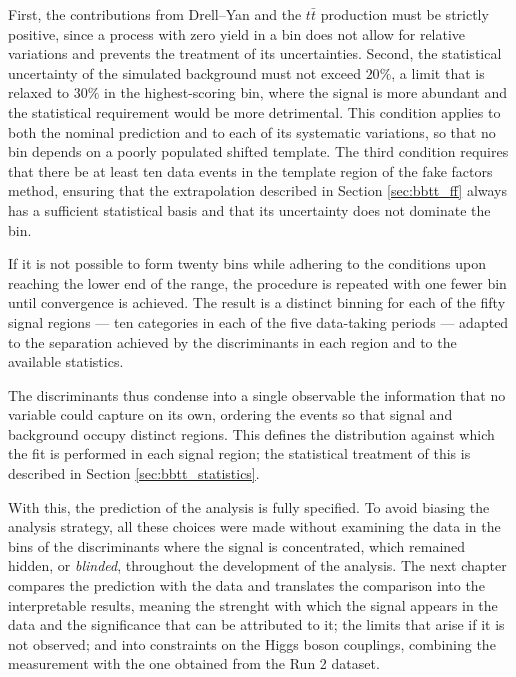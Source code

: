 First, the contributions from Drell--Yan and the $t\bar{t}$ production must be strictly positive, since a process with zero yield in a bin does not allow for relative variations and prevents the treatment of its uncertainties. Second, the statistical uncertainty of the simulated background must not exceed $20\%$, a limit that is relaxed to $30\%$ in the highest-scoring bin, where the signal is more abundant and the statistical requirement would be more detrimental. This condition applies to both the nominal prediction and to each of its systematic variations, so that no bin depends on a poorly populated shifted template. The third condition requires that there be at least ten data events in the template region of the fake factors method, ensuring that the extrapolation described in Section \ref{sec:bbtt_ff} always has a sufficient statistical basis and that its uncertainty does not dominate the bin.

If it is not possible to form twenty bins while adhering to the conditions upon reaching the lower end of the range, the procedure is repeated with one fewer bin until convergence is achieved. The result is a distinct binning for each of the fifty signal regions — ten categories in each of the five data-taking periods — adapted to the separation achieved by the discriminants in each region and to the available statistics.\medskip

The discriminants thus condense into a single observable the information that no variable could capture on its own, ordering the events so that signal and background occupy distinct regions. This defines the distribution against which the fit is performed in each signal region; the statistical treatment of this is described in Section \ref{sec:bbtt_statistics}.
\bigskip

With this, the prediction of the analysis is fully specified. To avoid biasing the analysis strategy, all these choices were made without examining the data in the bins of the discriminants where the signal is concentrated, which remained hidden, or \textit{blinded}, throughout the development of the analysis. The next chapter compares the prediction with the data and translates the comparison into the interpretable results, meaning the strenght with which the signal appears in the data and the significance that can be attributed to it; the limits that arise if it is not observed; and into constraints on the Higgs boson couplings, combining the measurement with the one obtained from the Run 2 dataset.






